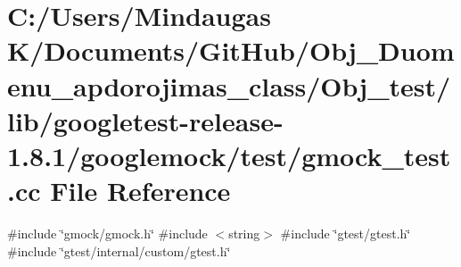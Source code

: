 \hypertarget{_obj__test_2lib_2googletest-release-1_88_81_2googlemock_2test_2gmock__test_8cc}{}\section{C\+:/\+Users/\+Mindaugas K/\+Documents/\+Git\+Hub/\+Obj\+\_\+\+Duomenu\+\_\+apdorojimas\+\_\+class/\+Obj\+\_\+test/lib/googletest-\/release-\/1.8.1/googlemock/test/gmock\+\_\+test.cc File Reference}
\label{_obj__test_2lib_2googletest-release-1_88_81_2googlemock_2test_2gmock__test_8cc}
{\ttfamily \#include \char`\"{}gmock/gmock.\+h\char`\"{}}\newline
{\ttfamily \#include $<$string$>$}\newline
{\ttfamily \#include \char`\"{}gtest/gtest.\+h\char`\"{}}\newline
{\ttfamily \#include \char`\"{}gtest/internal/custom/gtest.\+h\char`\"{}}\newline
